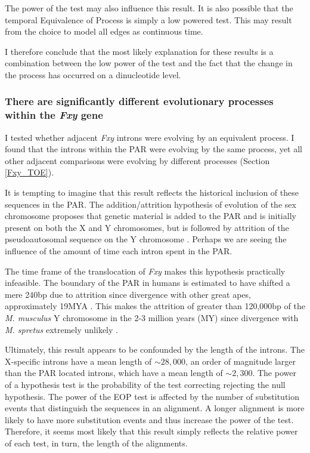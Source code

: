 The power of the test may also influence this result. It is also possible that the temporal Equivalence of Process is simply a low powered test. This may result from the choice to model all edges as continuous time. 

I therefore conclude that the most likely explanation for these results is a combination between the low power of the test and the fact that the change in the process has occurred on a dinucleotide level. 

\subsubsection{There are significantly different evolutionary processes within the \textit{Fxy} gene}

I tested whether adjacent \textit{Fxy} introns were evolving by an equivalent process. I found that the introns within the PAR were evolving by the same process, yet all other adjacent comparisons were evolving by different processes (Section \ref{Fxy_TOE}). 

It is tempting to imagine that this result reflects the historical inclusion of these sequences in the PAR. The addition/attrition hypothesis of evolution of the sex chromosome proposes that genetic material is added to the PAR and is initially present on both the X and Y chromosomes, but is followed by attrition of the pseudoautosomal sequence on the Y chromosome  \citep{Graves1995TheGenes}. Perhaps we are seeing the influence of the amount of time each intron spent in the PAR. 

The time frame of the translocation of \textit{Fxy} makes this hypothesis practically infeasible. The boundary of the PAR in humans is estimated to have shifted a mere 240bp due to attrition since divergence with other great apes, approximately 19MYA \citep{Mensah2014PseudoautosomalPopulation}. This makes the attrition of greater than 120,000bp of the \textit{M. musculus} Y chromosome in the 2-3 million years (MY) since divergence with \textit{M. spretus} extremely unlikely \citep{Huang2005HowMammals}. 

Ultimately, this result appears to be confounded by the length of the introns. The X-specific introns have a mean length of $\sim28,000$, an order of magnitude larger than the PAR located introns, which have a mean length of $\sim2,300$. The power of a hypothesis test is the probability of the test correcting rejecting the null hypothesis. The power of the EOP test is affected by the number of substitution events that distinguish the sequences in an alignment. A longer alignment is more likely to have more substitution events and thus increase the power of the test. Therefore, it seems most likely that this result simply reflects the relative power of each test, in turn, the length of the alignments. 

